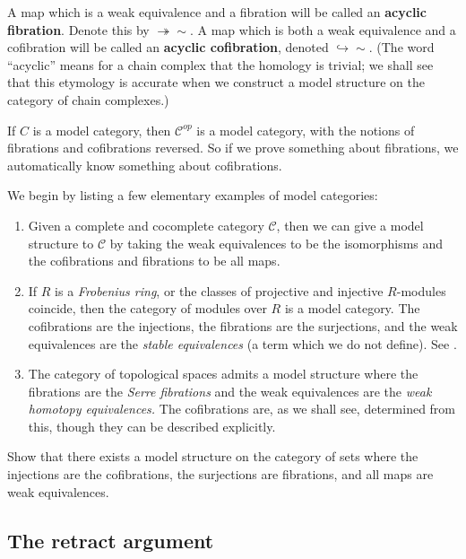 A map which is a weak equivalence and a fibration will be called an
\textbf{acyclic fibration}. Denote this by $\twoheadrightarrow{\sim}$. A map
which is both a weak equivalence and a cofibration will be called an
\textbf{acyclic cofibration}, denoted $\hookrightarrow{\sim}$.
(The word ``acyclic'' means for a chain complex that the homology is trivial;
we shall see that this etymology is accurate when we construct a model
structure on the category of chain complexes.)

\begin{remark} 
If $C$ is a model category, then $\mathcal{C}^{op}$ is a model category, with the notions of fibrations and cofibrations reversed. So if we prove something about fibrations, we automatically know something about cofibrations.
\end{remark}

We begin by listing a few elementary examples of model categories:

\begin{example} 
\begin{enumerate}
\item Given a complete and cocomplete category $\mathcal{C} $, then we can
give a model structure to $\mathcal{C}$ by taking the weak equivalences to be
the isomorphisms and the cofibrations and fibrations to be all maps.
\item If $R$ is a \emph{Frobenius ring}, or the classes of projective and
injective $R$-modules coincide, then the category of modules over $R$ is a
model category. The cofibrations are the injections, the fibrations are the
surjections, and the weak equivalences are the \emph{stable equivalences} (a
term which we do not define). See \cite{Ho07}.
\item The category of topological spaces admits a model structure where the
fibrations are the \emph{Serre fibrations} and the weak equivalences are the
\emph{weak homotopy equivalences.} The cofibrations are, as we shall see,
determined from this, though they can be described explicitly.
\end{enumerate}
\end{example} 


\begin{exercise} 
Show that there exists a model structure on the category of sets where the injections are
the cofibrations, the surjections are fibrations, and all maps are weak
equivalences.
\end{exercise} 


\subsection{The retract argument}

